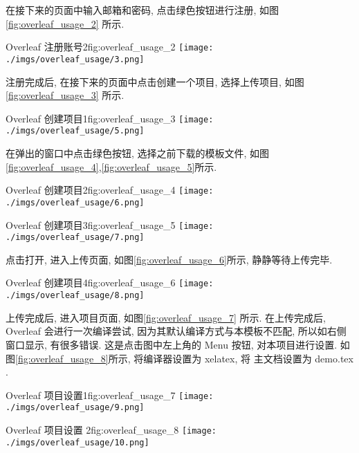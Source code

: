 \documentclass[bibsec, doctor, tabtoc, figtoc]{cugthesis}
\begin{document}
在接下来的页面中输入邮箱和密码, 点击绿色按钮进行注册,
如图\ref{fig:overleaf_usage_2} 所示.

\begin{tfig}{Overleaf 注册账号2}{fig:overleaf_usage_2}
\texttt{[image: ./imgs/overleaf\_usage/3.png]}
\end{tfig}

注册完成后, 在接下来的页面中点击创建一个项目, 选择上传项目,
如图\ref{fig:overleaf_usage_3} 所示.

\begin{tfig}{Overleaf  创建项目1}{fig:overleaf_usage_3}
\texttt{[image: ./imgs/overleaf\_usage/5.png]}
\end{tfig}

在弹出的窗口中点击绿色按钮, 选择之前下载的模板文件,
如图\ref{fig:overleaf_usage_4},\ref{fig:overleaf_usage_5}所示.

\begin{tfig}{Overleaf  创建项目2}{fig:overleaf_usage_4}
\texttt{[image: ./imgs/overleaf\_usage/6.png]}
\end{tfig}

\begin{tfig}{Overleaf  创建项目3}{fig:overleaf_usage_5}
\texttt{[image: ./imgs/overleaf\_usage/7.png]}
\end{tfig}

点击打开, 进入上传页面, 如图\ref{fig:overleaf_usage_6}所示, 静静等待上传完毕.

\begin{tfig}{Overleaf  创建项目4}{fig:overleaf_usage_6}
\texttt{[image: ./imgs/overleaf\_usage/8.png]}
\end{tfig}

上传完成后, 进入项目页面, 如图\ref{fig:overleaf_usage_7} 所示. 在上传完成后,
Overleaf 会进行一次编译尝试, 因为其默认编译方式与本模板不匹配,
所以如右侧窗口显示, 有很多错误. 这是点击图中左上角的 Menu 按钮,
对本项目进行设置. 如图\ref{fig:overleaf_usage_8}所示, 将编译器设置为 xelatex, 将
主文档设置为 demo.tex .

\begin{tfig}{Overleaf   项目设置1}{fig:overleaf_usage_7}
\texttt{[image: ./imgs/overleaf\_usage/9.png]}
\end{tfig}

\begin{tfig}{Overleaf  项目设置 2}{fig:overleaf_usage_8}
\texttt{[image: ./imgs/overleaf\_usage/10.png]}
\end{tfig}
\end{document}
